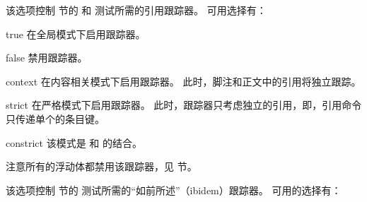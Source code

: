 \begin{optionlist}


该选项控制  节的  和  测试所需的引用跟踪器。
可用选择有：

\begin{valuelist}
\item[true] %
在全局模式下启用跟踪器。
\item[false] %
禁用跟踪器。
\item[context] %
在内容相关模式下启用跟踪器。
此时，脚注和正文中的引用将独立跟踪。
\item[strict] %
在严格模式下启用跟踪器。
此时，跟踪器只考虑独立的引用，即，引用命令只传递单个的条目键。
\item[constrict] %
该模式是  和  的结合。
\end{valuelist}

注意所有的浮动体都禁用该跟踪器，见  节。



该选项控制  节的  测试所需的“如前所述”（ibidem）跟踪器。
可用的选择有：


\end{optionlist}
